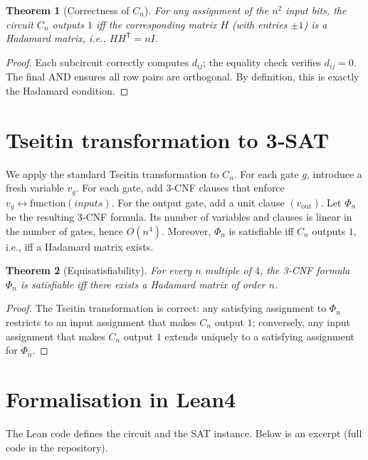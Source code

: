 \documentclass[11pt,a4paper]{article}
\newtheorem{theorem}{Theorem}[section]
\begin{document}
\begin{theorem}[Correctness of $C_n$]
For any assignment of the $n^2$ input bits, the circuit $C_n$ outputs $1$ iff the corresponding matrix $H$ (with entries $\pm1$) is a Hadamard matrix, i.e., $H H^{\mathsf T}=nI$.
\end{theorem}
\begin{proof}
Each subcircuit correctly computes $d_{ij}$; the equality check verifies $d_{ij}=0$. The final AND ensures all row pairs are orthogonal. By definition, this is exactly the Hadamard condition.
\end{proof}

\section{Tseitin transformation to 3‑SAT}

We apply the standard Tseitin transformation to $C_n$. For each gate $g$, introduce a fresh variable $v_g$. For each gate, add 3‑CNF clauses that enforce $v_g \leftrightarrow \text{function}(inputs)$. For the output gate, add a unit clause $(v_{\text{out}})$. Let $\Phi_n$ be the resulting 3‑CNF formula. Its number of variables and clauses is linear in the number of gates, hence $O(n^4)$. Moreover, $\Phi_n$ is satisfiable iff $C_n$ outputs $1$, i.e., iff a Hadamard matrix exists.

\begin{theorem}[Equisatisfiability]
For every $n$ multiple of $4$, the 3‑CNF formula $\Phi_n$ is satisfiable iff there exists a Hadamard matrix of order $n$.
\end{theorem}
\begin{proof}
The Tseitin transformation is correct: any satisfying assignment to $\Phi_n$ restricts to an input assignment that makes $C_n$ output $1$; conversely, any input assignment that makes $C_n$ output $1$ extends uniquely to a satisfying assignment for $\Phi_n$.
\end{proof}

\section{Formalisation in Lean4}

The Lean code defines the circuit and the SAT instance. Below is an excerpt (full code in the repository).
\end{document}
